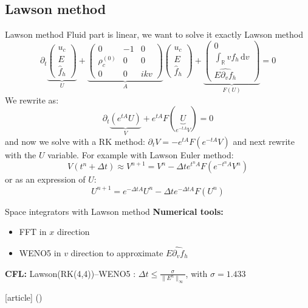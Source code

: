 \documentclass{beamer}
\newcommand{\cmark}{{\color{dgreen}\ding{52}}}
\newcommand{\arrow}{{\color{PLB}\ding{220}}}
\newcommand{\mbold}[1]{{\textbf{\color{PLB}#1}}}
\newcommand{\customcite}[1]{\citeauthor{#1} (\citeyear{#1})}
\begin{document}
\subsection{Lawson method}
\begin{frame}{Lawson method}
  Fluid part is linear, we want to solve it exactly \arrow Lawson method
  $$
    \partial_t \underbrace{\begin{pmatrix}
      u_c\\E\\\hat{f}_h
    \end{pmatrix}}_{U} + \underbrace{\begin{pmatrix}
      0 & -1 & 0 \\ \rho_c^{(0)} & 0 & 0 \\ 0 & 0 & ikv
    \end{pmatrix}}_{A} \begin{pmatrix}
      u_c\\E\\\hat{f}_h
    \end{pmatrix} + \underbrace{\begin{pmatrix}
      0\\\int_\mathbb{R}vf_h\,\mathrm{d}v \\\widehat{E\partial_vf_h}
    \end{pmatrix}}_{F(U)} = 0
  $$
  We rewrite as:
  $$
    \partial_t\underbrace{\left(e^{tA}U\right)}_{V} + e^{tA}F(\underbrace{U}_{e^{-tA}V}) = 0
  $$
  and now we solve with a RK method: $\partial_tV = -e^{tA}F(e^{-tA}V)$ and next rewrite with the $U$ variable. For example with Lawson Euler method:
  $$
    V(t^n+\Delta t) \approx V^{n+1} = V^n - \Delta t e^{t^nA}F(e^{-t^nA}V^n)
  $$
  or as an expression of $U$:
  $$
    U^{n+1} = e^{-\Delta t A}U^n - \Delta te^{-\Delta t A}F(U^n)
  $$
\end{frame}

\begin{frame}{Space integrators with Lawson method}
  \mbold{Numerical tools:}
  \begin{itemize}
    \item FFT in $x$ direction
    \item WENO5 in $v$ direction to approximate $\widehat{E\partial_vf_h}$
  \end{itemize}

  \mbold{CFL:} Lawson(RK(4,4))--WENO5 : $\Delta t\leq\frac{\sigma}{\|E^n\|_\infty}$, with $\sigma=1.433$
  \begin{thebibliography}{9}
    [article]
     \customcite{Crouseilles:2019b}
  \end{thebibliography}
\end{frame}
\end{document}
